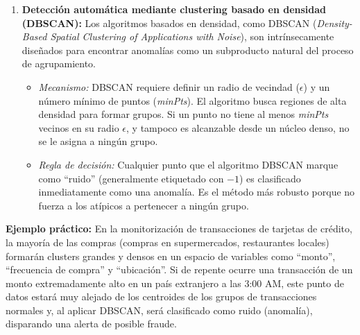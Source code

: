 \begin{enumerate}
    \item \textbf{Detección automática mediante clustering basado en densidad (DBSCAN):}
    Los algoritmos basados en densidad, como DBSCAN (\textit{Density-Based Spatial Clustering of Applications with Noise}), son intrínsecamente diseñados para encontrar anomalías como un subproducto natural del proceso de agrupamiento.
    \begin{itemize}
        \item \textit{Mecanismo:} DBSCAN requiere definir un radio de vecindad ($\epsilon$) y un número mínimo de puntos (\textit{minPts}). El algoritmo busca regiones de alta densidad para formar grupos. Si un punto no tiene al menos \textit{minPts} vecinos en su radio $\epsilon$, y tampoco es alcanzable desde un núcleo denso, no se le asigna a ningún grupo.
        \item \textit{Regla de decisión:} Cualquier punto que el algoritmo DBSCAN marque como ``ruido'' (generalmente etiquetado con $-1$) es clasificado inmediatamente como una anomalía. Es el método más robusto porque no fuerza a los atípicos a pertenecer a ningún grupo.
    \end{itemize}
\end{enumerate}

\textbf{Ejemplo práctico:}
En la monitorización de transacciones de tarjetas de crédito, la mayoría de las compras (compras en supermercados, restaurantes locales) formarán clusters grandes y densos en un espacio de variables como ``monto'', ``frecuencia de compra'' y ``ubicación''. Si de repente ocurre una transacción de un monto extremadamente alto en un país extranjero a las 3:00 AM, este punto de datos estará muy alejado de los centroides de los grupos de transacciones normales y, al aplicar DBSCAN, será clasificado como ruido (anomalía), disparando una alerta de posible fraude.
